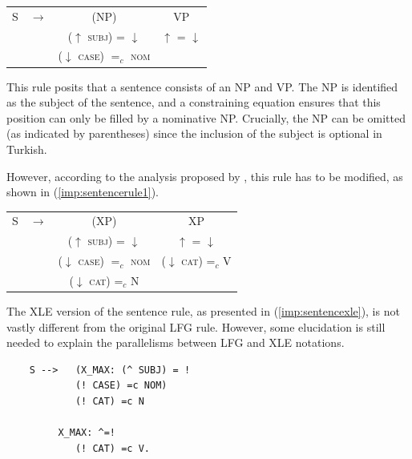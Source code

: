 \begin{tabular}{lccc}
	S & $\longrightarrow$ & (NP) & VP \\
	& & ($\uparrow$ \textsc{subj}) = $\downarrow$ & $\uparrow$ = $\downarrow$ \\
	&			   & ($\downarrow$ \textsc{case}) $=_c$ \textsc{nom} &  
\end{tabular}
\xe

This rule posits that a sentence consists of an NP and VP. The NP is identified as the subject of the sentence, and a constraining equation ensures that this position can only be filled by a nominative NP. Crucially, the NP can be omitted (as indicated by parentheses) since the inclusion of the subject is optional in Turkish. 

However, according to the analysis proposed by \citet{prz:pat:21:oup}, this rule has to be modified, as shown in (\ref{imp:sentencerule1}).

\pex
\vspace{-12pt}
\label{imp:sentencerule1}

\begin{tabular}{lccc}
	S & $\longrightarrow$ & (XP) & XP \\
	& & ($\uparrow$ \textsc{subj}) = $\downarrow$ & $\uparrow$ = $\downarrow$ \\
	&			   & ($\downarrow$ \textsc{case}) $=_c$ \textsc{nom} & ($\downarrow$ \textsc{cat}) =$_c$ V  \\
	& & ($\downarrow$ \textsc{cat}) =$_c$ N &  \\
\end{tabular}
\xe

The XLE version of the sentence rule, as presented in (\ref{imp:sentencexle}), is not vastly different from the original LFG rule. However, some elucidation is still needed to explain the parallelisms between LFG and XLE notations.

\pex
\label{imp:sentencexle}
\vspace{-18pt}

\begin{lstlisting}
	S -->   (X_MAX: (^ SUBJ) = !
	  		(! CASE) =c NOM)
			(! CAT) =c N
			
		 X_MAX: ^=!
			(! CAT) =c V.
\end{lstlisting}
\xe

